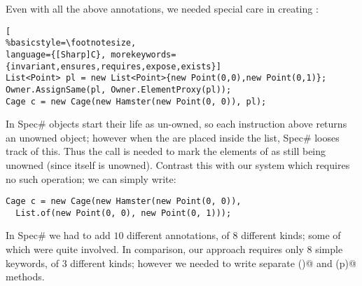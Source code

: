
Even with all the above annotations, we needed special care in creating \Q@Cage@s:%
\begin{lstlisting}[
%basicstyle=\footnotesize,
language={[Sharp]C}, morekeywords={invariant,ensures,requires,expose,exists}]
List<Point> pl = new List<Point>{new Point(0,0),new Point(0,1)};
Owner.AssignSame(pl, Owner.ElementProxy(pl));
Cage c = new Cage(new Hamster(new Point(0, 0)), pl);
\end{lstlisting}

\noindent In Spec\# objects start their life as un-owned, so each \Q@new@ instruction above returns an unowned object; however when the \Q@Point@s are placed inside the \Q@pl@ list, Spec\# looses track of this. Thus the \Q@AssignSame@ call is needed to mark the elements of \Q@pl@ as still being unowned (since \Q@pl@ itself is unowned).
Contrast this with our system which requires no such operation; we can simply write:
\begin{lstlisting}
Cage c = new Cage(new Hamster(new Point(0, 0)),
  List.of(new Point(0, 0), new Point(0, 1)));
\end{lstlisting}

In Spec\# we had to add $10$ different annotations, of $8$ different kinds; some of which were quite involved. In comparison, our approach requires only $8$ simple keywords, of $3$ different kinds; however we needed to write 
separate \Q@pos()@ and \Q@moveTo(p)@ methods.

